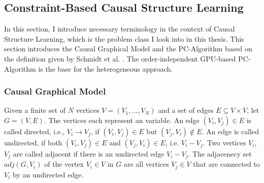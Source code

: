 \subsection{Constraint-Based Causal Structure Learning}
In this section, I introduce necessary terminology in the context of Causal Structure Learning, which is the problem class I look into in this thesis. This section introduces the Causal Graphical Model and the PC-Algorithm based on the definition given by Schmidt et al. \cite{schmidtOrderIndependentConstraintBasedCausal2018}. The order-independent GPU-based PC-Algorithm is the base for the heterogeneous approach.

\subsubsection{Causal Graphical Model}
Given a finite set of $N$ vertices $V = (V_1,...,V_N)$ and a set of edges $E \subseteq V \times V$, let $G = (V,E)$. The vertices each represent an variable. An edge $(V_i, V_j) \in E$ is called directed, i.e., $V_i \rightarrow V_j$, if $(V_i,V_j) \in E$ but $(V_j, V_i) \notin E$. An edge is called undirected, if both $(V_i,V_j) \in E$ and $(V_j, V_i) \in E$, i.e. $V_i - V_j$. Two vertices $V_i$, $V_j$ are called adjacent if there is an undirected edge $V_i - V_j$. The adjacenecy set $adj(G, V_i)$ of the vertex $V_i \in V$ in $G$ are all vertices $V_j \in V$ that are connected to $V_i$ by an undirected edge.

